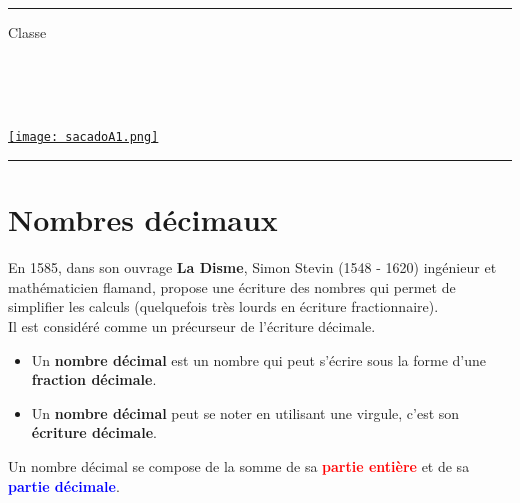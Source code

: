 \documentclass[a4paper,dvipsnames]{article}
\begin{document}

\fancyhead[C]{}
\hrule\medskip %
\begin{minipage}{0.295\textwidth} 
\raggedright
Classe \myClasse \hfill\\
\myDiscipline \hfill\\
\myParcours \hfill\\
\end{minipage}
\begin{minipage}{0.4\textwidth} 
\centering 
\scshape\huge
\textcolor{sacado_purple}{\myTitle} \\ 
\normalsize 
\end{minipage}
\begin{minipage}{0.295\textwidth} 
\raggedleft
\href{https://sacado.xyz/}{\texttt{[image: sacadoA1.png]}}
\end{minipage}
\medskip \hrule
\bigskip


\section{Nombres décimaux}

\begin{His}
En 1585, dans son ouvrage \textbf{La Disme}, Simon Stevin (1548 - 1620) ingénieur et mathématicien flamand, propose une écriture des nombres qui permet de simplifier les calculs (quelquefois très lourds en écriture fractionnaire).\\

Il est considéré comme un précurseur de l'écriture décimale.
\end{His}

\begin{Def}
\begin{itemize}
\item Un \textbf{nombre décimal} est un nombre qui peut s'écrire sous la forme d'une \textbf{fraction décimale}.
\item Un \textbf{nombre décimal} peut se noter en utilisant une virgule, c'est son \textbf{écriture décimale}.
\end{itemize}

Un nombre décimal se compose de la somme de sa \textbf{\textcolor{red}{partie entière}} et de sa \textbf{\textcolor{blue}{partie décimale}}.
\end{Def}
\end{document}
